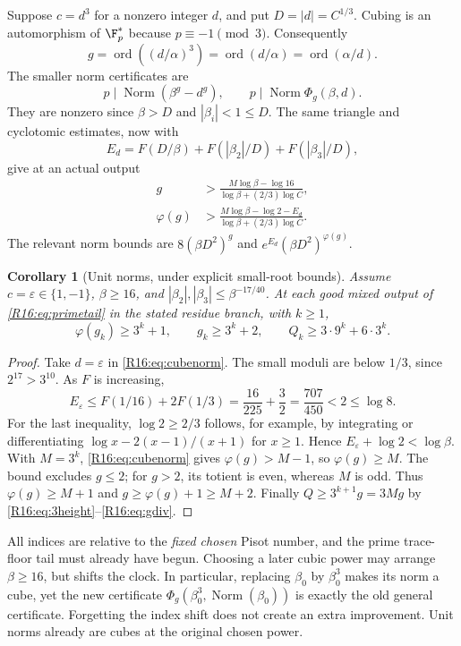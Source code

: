 \documentclass[11pt,a4paper]{article}
\newtheorem{corollary}[theorem]{Corollary}\newtheorem{mainthm}[theorem]{Theorem}
\theoremstyle{definition}\newtheorem{definition}[theorem]{Definition}
\theoremstyle{remark}\newtheorem{remark}[theorem]{Remark}
\DeclareMathOperator{\Norm}{Norm}\DeclareMathOperator{\ord}{ord}\DeclareMathOperator{\Gal}{Gal}
\begin{document}
Suppose $c=d^3$ for a nonzero integer $d$, and put $D=|d|=C^{1/3}$.
Cubing is an automorphism of $\F_p^*$ because $p\equiv-1\pmod3$.
Consequently
\[
 g=\ord((d/\alpha)^3)=\ord(d/\alpha)=\ord(\alpha/d).
\]
The smaller norm certificates are
\[
 p\mid\Norm(\beta^g-d^g),\qquad
 p\mid\Norm\Phi_g(\beta,d).
\]
They are nonzero since $\beta>D$ and $|\beta_i|<1\le D$. The same
triangle and cyclotomic estimates, now with
\[
 E_d=F(D/\beta)+F(|\beta_2|/D)+F(|\beta_3|/D),
\]
give at an actual output
\begin{equation}\label{R16:eq:cubenorm}
 \begin{split}
 g&>\frac{M\log\beta-\log16}{\log\beta+(2/3)\log C},\\
 \varphi(g)&>\frac{M\log\beta-\log2-E_d}
                     {\log\beta+(2/3)\log C}.
 \end{split}
\end{equation}
The relevant norm bounds are $8(\beta D^2)^g$ and
$e^{E_d}(\beta D^2)^{\varphi(g)}$.

\begin{corollary}[Unit norms, under explicit small-root bounds]
Assume $c=\varepsilon\in\{1,-1\}$, $\beta\ge16$, and
$|\beta_2|,|\beta_3|\le\beta^{-17/40}$. At each good mixed output of
\eqref{R16:eq:primetail} in the stated residue branch, with $k\ge1$,
\[
 \varphi(g_k)\ge3^k+1,\qquad g_k\ge3^k+2,
 \qquad Q_k\ge3\cdot9^k+6\cdot3^k.
\]
\end{corollary}
\begin{proof}
Take $d=\varepsilon$ in \eqref{R16:eq:cubenorm}. The small moduli are below
$1/3$, since $2^{17}>3^{10}$. As $F$ is increasing,
\[
 E_\varepsilon\le F(1/16)+2F(1/3)
 =\frac{16}{225}+\frac32=\frac{707}{450}<2\le\log8.
\]
For the last inequality, $\log2\ge2/3$ follows, for example, by
integrating or differentiating
$\log x-2(x-1)/(x+1)$ for $x\ge1$.
Hence $E_\varepsilon+\log2<\log\beta$.
With $M=3^k$, \eqref{R16:eq:cubenorm} gives $\varphi(g)>M-1$, so
$\varphi(g)\ge M$. The bound excludes $g\le2$; for $g>2$, its totient
is even, whereas $M$ is odd. Thus $\varphi(g)\ge M+1$ and
$g\ge\varphi(g)+1\ge M+2$. Finally
$Q\ge3^{k+1}g=3Mg$ by \eqref{R16:eq:3height}--\eqref{R16:eq:gdiv}.
\end{proof}

All indices are relative to the \emph{fixed chosen} Pisot number, and the
prime trace-floor tail must already have begun. Choosing a later cubic
power may arrange $\beta\ge16$, but shifts the clock. In particular,
replacing $\beta_0$ by $\beta_0^3$ makes its norm a cube, yet the new
certificate $\Phi_g(\beta_0^3,\Norm(\beta_0))$ is exactly the old
general certificate. Forgetting the index shift does not create an extra
improvement. Unit norms already are cubes at the original chosen power.
\end{document}

